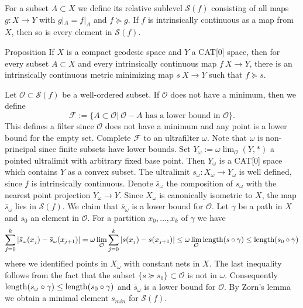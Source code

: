 \documentclass[a4paper,10pt]{amsart}
\begin{document}
For a subset $A\subset X$  we 
define its relative sublevel $\mathcal{S}(f)$ consisting of all maps $g:X\to Y$
with $g|_{A}=f|_{A}$ and $f\succcurlyeq g$. If $f$ is intrinsically continuous as a map from $X$, then
so is every element in $\mathcal{S}(f)$. 

\begin{thm}{Proposition}\label{prop:exist}
 If $X$ is a compact geodesic space and $Y$ a CAT[0] space, then for every subset $A\subset X$ and every intrinsically continuous map $f\:X\rightarrow Y$,
 there is an intrinsically continuous  metric minimizing map $s\:X\rightarrow Y$
 such that $f\succcurlyeq s$.
\end{thm}


Let $\mathcal{O}\subset\mathcal{S}(f)$ be a well-ordered subset. If $\mathcal{O}$ does not
have a minimum, then we define
$$
\mathcal{F}:=\{A\subset\mathcal{O}|\ \mathcal{O}-A\text{ has a lower bound in }\mathcal{O}\}.
$$
This defines a filter since $\mathcal{O}$ does not have a minimum and any point is a lower bound for the empty set.
Complete $\mathcal{F}$ to an ultrafilter $\omega$. Note that $\omega$ is non-principal since finite subsets have lower bounds.
Set $Y_\omega:=\omega\lim_{\mathcal{O}}(Y,*)$ a pointed ultralimit with arbitrary fixed base point. Then $Y_\omega$
is a CAT[0] space which contains $Y$ as a convex subset. The ultralimit $s_\omega:X_\omega\to Y_\omega$ is well defined, since
$f$ is intrinsically continuous. Denote $\bar s_\omega$ the composition of $s_\omega$ with the nearest point projection $Y_\omega\to Y$.
Since $X_\omega$ is canonically isometric to $X$, the map $\bar s_\omega$ lies in $\mathcal{S}(f)$. We claim that $\bar s_\omega$
is a lower bound for $\mathcal{O}$. Let $\gamma$ be a path in $X$ and $s_0$ an element in $\mathcal{O}$. For a partition $x_0,\ldots,x_k$
of $\gamma$ we have
$$
\sum_{j=0}^k|\bar s_\omega(x_j)-\bar s_\omega(x_{j+1})|=\omega\lim_{\mathcal{O}}\sum_{j=0}^k|s(x_j)-s(x_{j+1})|\leq \omega\lim_{\mathcal{O}}\mathop{\rm length}\nolimits(s\circ\gamma)\leq \mathop{\rm length}\nolimits(s_0\circ\gamma)
$$
where we identified points in $X_\omega$ with constant nets in $X$. The last inequality follows from the fact that the subset $\{s\succcurlyeq s_0\}\subset \mathcal{O}$
is not in $\omega$. Consequently $\mathop{\rm length}\nolimits(s_\omega\circ\gamma)\leq \mathop{\rm length}\nolimits(s_0\circ\gamma)$ and $\bar s_\omega$
is a lower bound for $\mathcal{O}$. By Zorn's lemma we obtain a minimal element $s_{min}$ for $\mathcal{S}(f)$.
\qeds
\end{document}
